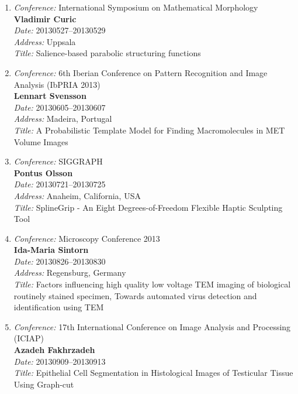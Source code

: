 \begin{enumerate}
\item 
{\em Conference:} International Symposium on Mathematical Morphology~\\
{\bf Vladimir Curic}~\\
{\em Date:} 20130527--20130529~\\
{\em Address:} Uppsala~\\
{\em Title:} Salience-based parabolic structuring functions

\item 
{\em Conference:} 6th Iberian Conference on Pattern Recognition and Image Analysis (IbPRIA 2013)~\\
{\bf Lennart Svensson}~\\
{\em Date:} 20130605--20130607~\\
{\em Address:} Madeira, Portugal~\\
{\em Title:} A Probabilistic Template Model for Finding Macromolecules in MET Volume Images


\item 
{\em Conference:} SIGGRAPH~\\
{\bf Pontus Olsson}~\\
{\em Date:} 20130721--20130725~\\
{\em Address:} Anaheim, California, USA~\\
{\em Title:} SplineGrip - An Eight Degrees-of-Freedom Flexible Haptic Sculpting Tool

\item 
{\em Conference:} Microscopy Conference 2013~\\
{\bf Ida-Maria Sintorn}~\\
{\em Date:} 20130826--20130830~\\
{\em Address:} Regensburg, Germany~\\
{\em Title:} Factors influencing high quality low voltage TEM imaging of biological routinely stained specimen, Towards automated virus detection and identification using TEM

\item 
{\em Conference:} 17th International Conference on Image Analysis and Processing (ICIAP)~\\
{\bf Azadeh Fakhrzadeh}~\\
{\em Date:} 20130909--20130913~\\
{\em Title:} Epithelial Cell Segmentation in Histological Images of Testicular Tissue Using Graph-cut








\end{enumerate}

